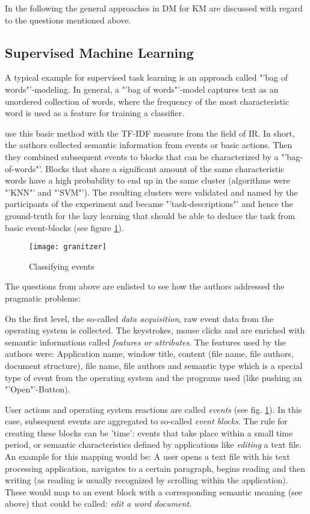 In the following the general approaches in \acs{DM} for \acs{KM} are discussed with regard to the questions mentioned above. 


\subsection{Supervised Machine Learning}
A typical example for supervised task learning is an approach called "'bag of words"'-modeling. In general, a "'bag of words"'-model captures text as an unordered collection of words, where the frequency of the most characteristic word is used as a feature for training a classifier. 

\cite{granitzer2008analysis} use this basic method with the \ac{TF-IDF} measure from the field of \ac{IR}. In short, the authors collected semantic information from events or basic actions. Then they combined subsequent events to blocks that can be characterized by a "'bag-of-words"'. Blocks that share a significant amount of the same characteristic words have a high probability to end up in the same cluster (algorithms were "'KNN"' and "'SVM"'). The resulting clusters were validated and named by the participants of the experiment and became "'task-descriptions"' and hence the ground-truth for the lazy learning  that should be able to deduce the task from basic event-blocks (see figure \ref{fig6}).
\begin{figure}[ht]
	\centering
  \texttt{[image: granitzer]}
	\caption{Classifying events}
	\label{fig6}
\end{figure}
The questions from above are enlisted to see how the authors addressed the pragmatic problems:


On the first level, the so-called \textit{data acquisition}, raw event data from the operating system is collected. The  keystrokes, mouse clicks and are enriched with semantic informations called \textit{features or attributes}. The features used by the authors were: Application name, window title, content (file  name, file authors, document structure), file name, file authors and semantic type which is a special type of event from the operating system and the programs used (like pushing an "'Open"'-Button).


User actions and operating system reactions are called \textit{events} (see fig. \ref{fig6}).  In this case, subsequent events are aggregated to so-called \textit{event blocks}. The rule for creating these blocks can be 'time': events that take place within a small time period, or semantic characteristics defined by applications like \textit{editing} a text file. An example for this mapping would be: A user opens a text file with his text processing application, navigates to a certain paragraph, begins reading and then writing (as reading is usually recognized by scrolling within the application). These would map to an event block with a corresponding semantic meaning (see above) that could be called: \textit{edit a word document}. 

